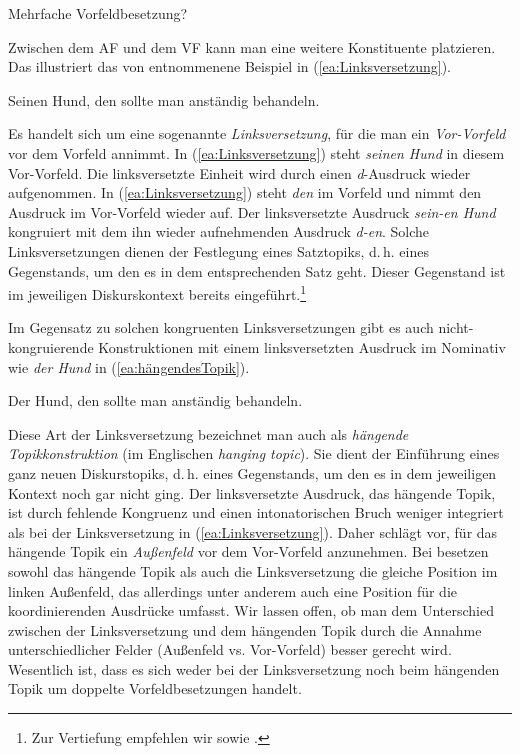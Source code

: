 \begin{Exkurs}{Mehrfache Vorfeldbesetzung?}\label{Exkurs:Mehrfache VFB}
    
Zwischen dem AF und dem VF kann man eine weitere Konstituente platzieren. Das illustriert das von \citet[70]{Hoehle19862018} entnommenene Beispiel in  (\ref{ea:Linksversetzung}). 

\ea \label{ea:Linksversetzung} Seinen Hund, den sollte man anständig behandeln.
\z 

Es handelt sich um eine sogenannte \textit{Linksversetzung}, für die man ein \textit{Vor-Vorfeld} vor dem Vorfeld annimmt. In (\ref{ea:Linksversetzung}) steht \textit{seinen Hund} in diesem Vor-Vorfeld. Die linksversetzte Einheit wird durch einen \textit{d}-Ausdruck wieder aufgenommen. In (\ref{ea:Linksversetzung}) steht \textit{den} im Vorfeld und nimmt den Ausdruck im Vor-Vorfeld wieder auf. Der linksversetzte Ausdruck \textit{sein-en Hund} kongruiert mit dem ihn wieder aufnehmenden Ausdruck \textit{d-en}. Solche Linksversetzungen dienen der Festlegung eines Satztopiks, d.\,h. eines Gegenstands, um den es in dem entsprechenden Satz geht. Dieser Gegenstand ist im jeweiligen Diskurskontext bereits eingeführt.\footnote{Zur Vertiefung empfehlen wir \citet[54--56]{Woellstein2014} sowie \citet[142--153]{AltmannHofman}.} 

Im Gegensatz zu solchen kongruenten Linksversetzungen gibt es auch nicht-kongruierende Konstruktionen mit einem linksversetzten Ausdruck im Nominativ wie \textit{der Hund} in (\ref{ea:hängendesTopik}). 

\ea \label{ea:hängendesTopik} Der Hund, den sollte man anständig behandeln.
\z 

Diese Art der Linksversetzung bezeichnet man auch als \textit{hängende Topikkonstruktion} (im Englischen \textit{hanging topic}). Sie dient der Einführung eines ganz neuen Diskurstopiks, d.\,h. eines Gegenstands, um den es in dem jeweiligen Kontext noch gar nicht ging. Der linksversetzte Ausdruck, das hängende Topik, ist durch fehlende Kongruenz und einen intonatorischen Bruch weniger integriert als bei der Linksversetzung in (\ref{ea:Linksversetzung}). Daher schlägt \citet[71]{Woellstein2014} vor, für das hängende Topik ein \textit{Außenfeld} vor dem Vor-Vorfeld anzunehmen. Bei \citet[1580]{ZifHoffStr1997} besetzen sowohl das hängende Topik als auch die Linksversetzung die gleiche Position im linken Außenfeld, das allerdings unter anderem auch eine Position für die koordinierenden Ausdrücke umfasst. Wir lassen offen, ob man dem Unterschied zwischen der Linksversetzung und dem hängenden Topik durch die Annahme unterschiedlicher Felder (Außenfeld vs. Vor-Vorfeld) besser gerecht wird. Wesentlich ist, dass es sich weder bei der Linksversetzung noch beim hängenden Topik um doppelte Vorfeldbesetzungen handelt.   


\end{Exkurs}
